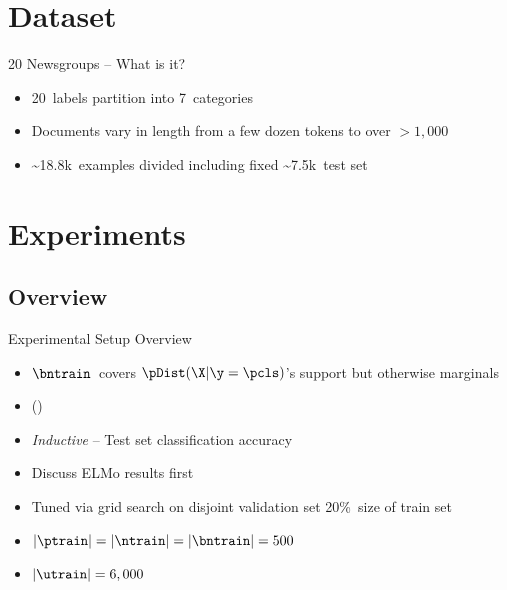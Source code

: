 \section{Dataset}
\begin{frame}{20 Newsgroups -- What is it?}
  \begin{itemize}
    \item 20~labels partition into 7~categories 
    \item Documents vary in length from a few dozen tokens to over ${{>}1,000}$
  \end{itemize}
  \vfill
   
  \begin{itemize}[<+->]
    \item \textasciitilde18.8k~examples divided including fixed \textasciitilde7.5k~test set
  \end{itemize}
  \vfill
  {
    \begin{center}
      \scriptsize
      \onslide<+->{}
    \end{center}
  }
\end{frame}

\section{Experiments}
\subsection{Overview}
\begin{frame}{Experimental Setup Overview}
  \begin{itemize}[<+->]
    \setlength{\itemsep}{6pt}
    \item $\bntrain$~covers  ${\pDist(\X \vert \y = \pcls)}$'s support but otherwise marginals 
    \item () 
  \end{itemize}
  \vfill
  \begin{itemize}[<+->]
    \setlength{\itemsep}{6pt}
    \item \textit{Inductive} -- Test set classification accuracy
    \item Discuss ELMo results first 
  \end{itemize}
  \vfill
  \begin{itemize}[<+->]
    \setlength{\itemsep}{6pt}
    \item Tuned via grid search on disjoint validation set 20\%~size of train set
    \item ${\abs{\ptrain} = \abs{\ntrain} = \abs{\bntrain} = 500}$
    \item ${\abs{\utrain} = 6,000}$
  \end{itemize}
\end{frame}

